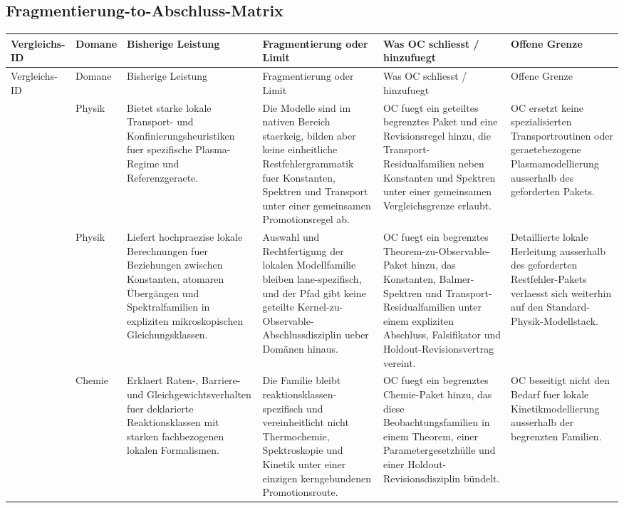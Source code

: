 \subsection{Fragmentierung-to-Abschluss-Matrix}
\begin{longtable}{@{}L{0.17\textwidth}L{0.09\textwidth}L{0.17\textwidth}L{0.17\textwidth}L{0.20\textwidth}L{0.14\textwidth}@{}}
\toprule
Vergleichs-ID & Domane & Bisherige Leistung & Fragmentierung oder Limit & Was OC schliesst / hinzufuegt & Offene Grenze \\
\midrule
\endfirsthead
\toprule
Vergleichs-ID & Domane & Bisherige Leistung & Fragmentierung oder Limit & Was OC schliesst / hinzufuegt & Offene Grenze \\
\midrule
\endhead
{} & Physik & Bietet starke lokale Transport- und Konfinierungsheuristiken fuer spezifische Plasma-Regime und Referenzgeraete. & Die Modelle sind im nativen Bereich staerkeig, bilden aber keine einheitliche Restfehlergrammatik fuer Konstanten, Spektren und Transport unter einer gemeinsamen Promotionsregel ab. & OC fuegt ein geteiltes begrenztes Paket und eine Revisionsregel hinzu, die Transport-Residualfamilien neben Konstanten und Spektren unter einer gemeinsamen Vergleichsgrenze erlaubt. & OC ersetzt keine spezialisierten Transportroutinen oder geraetebezogene Plasmamodellierung ausserhalb des geforderten Pakets. \\
 & Physik & Liefert hochpraezise lokale Berechnungen fuer Beziehungen zwischen Konstanten, atomaren Übergängen und Spektralfamilien in expliziten mikroskopischen Gleichungsklassen. & Auswahl und Rechtfertigung der lokalen Modellfamilie bleiben lane-spezifisch, und der Pfad gibt keine geteilte Kernel-zu-Observable-Abschlussdisziplin ueber Domänen hinaus. & OC fuegt ein begrenztes Theorem-zu-Observable-Paket hinzu, das Konstanten, Balmer-Spektren und Transport-Residualfamilien unter einem expliziten Abschluss, Falsifikator und Holdout-Revisionsvertrag vereint. & Detaillierte lokale Herleitung ausserhalb des geforderten Restfehler-Pakets verlaesst sich weiterhin auf den Standard-Physik-Modellstack. \\
 & Chemie & Erklaert Raten-, Barriere- und Gleichgewichtsverhalten fuer deklarierte Reaktionsklassen mit starken fachbezogenen lokalen Formalismen. & Die Familie bleibt reaktionsklassen-spezifisch und vereinheitlicht nicht Thermochemie, Spektroskopie und Kinetik unter einer einzigen kerngebundenen Promotionsroute. & OC fuegt ein begrenztes Chemie-Paket hinzu, das diese Beobachtungsfamilien in einem Theorem, einer Parametergesetzhülle und einer Holdout-Revisionsdisziplin bündelt. & OC beseitigt nicht den Bedarf fuer lokale Kinetikmodellierung ausserhalb der begrenzten Familien. \\

\end{longtable}
